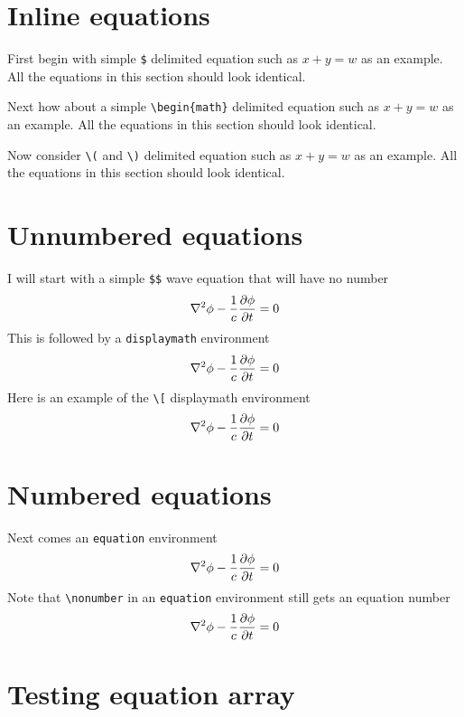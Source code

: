 \documentclass{article}
\begin{document}
\section{Inline equations}

First begin with simple \verb#$# delimited equation such as
$x+y=w$ as an example.  All the equations in this section should
look identical.

Next how about a simple \verb#\begin{math}# delimited equation such as
\begin{math}x+y=w\end{math} as an example.  All the equations in this section should
look identical.

Now consider \verb#\(# and \verb#\)# delimited equation such as
\(x+y=w\) as an example.  All the equations in this section should
look identical.

\section{Unnumbered equations}

I will start with a simple \verb#$$# wave equation
that will have no number
$$
\nabla^2 \phi -{1\over c} {\partial \phi\over \partial t}  = 0
$$
This is followed by a \verb#displaymath# environment
\begin{displaymath}
\nabla^2 \phi -{1\over c} {\partial \phi\over \partial t}  = 0
\end{displaymath}
Here is an example of the \verb#\[# displaymath environment
\[
\nabla^2 \phi -{1\over c} {\partial \phi\over \partial t}  = 0
\]


\section{Numbered equations}
Next comes an \verb#equation# environment
\begin{equation}
\nabla^2 \phi -{1\over c} {\partial \phi\over \partial t}  = 0
\end{equation}
Note that \verb#\nonumber# in an \verb#equation# environment still gets
an equation number
\begin{equation}
\nabla^2 \phi -{1\over c} {\partial \phi\over \partial t}  = 0 \nonumber
\end{equation}

\section{Testing equation array}
\end{document}
